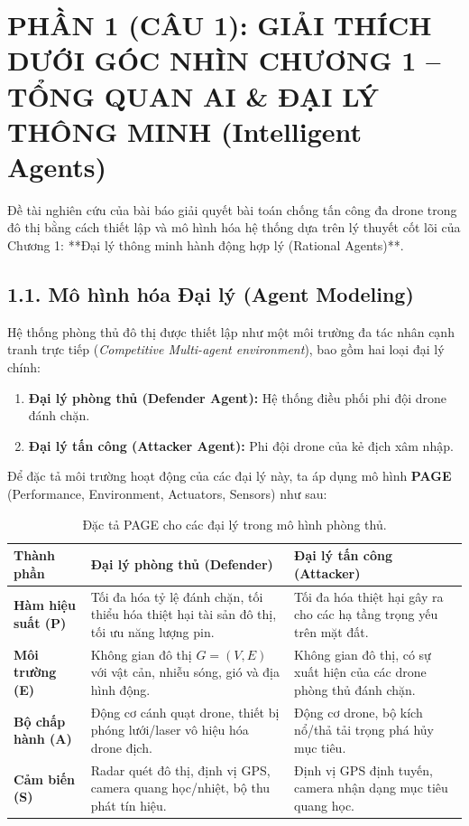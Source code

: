 \documentclass[../main.tex]{subfiles}
\begin{document}

\section{PHẦN 1 (CÂU 1): GIẢI THÍCH DƯỚI GÓC NHÌN CHƯƠNG 1 -- TỔNG QUAN AI \& ĐẠI LÝ THÔNG MINH (Intelligent Agents)}

Đề tài nghiên cứu của bài báo \cite{mutzari2025defending} giải quyết bài toán chống tấn công đa drone trong đô thị bằng cách thiết lập và mô hình hóa hệ thống dựa trên lý thuyết cốt lõi của Chương 1: **Đại lý thông minh hành động hợp lý (Rational Agents)**. 

\subsection{1.1. Mô hình hóa Đại lý (Agent Modeling)}
Hệ thống phòng thủ đô thị được thiết lập như một môi trường đa tác nhân cạnh tranh trực tiếp (\textit{Competitive Multi-agent environment}), bao gồm hai loại đại lý chính:
\begin{enumerate}
    \item \textbf{Đại lý phòng thủ (Defender Agent):} Hệ thống điều phối phi đội drone đánh chặn.
    \item \textbf{Đại lý tấn công (Attacker Agent):} Phi đội drone của kẻ địch xâm nhập.
\end{enumerate}

Để đặc tả môi trường hoạt động của các đại lý này, ta áp dụng mô hình \textbf{PAGE} (Performance, Environment, Actuators, Sensors) như sau:

\begin{table}[h!]
\centering
\small
\begin{tabular}{|p{2.5cm}|p{4.5cm}|p{4.5cm}|}
\hline
\textbf{Thành phần} & \textbf{Đại lý phòng thủ (Defender)} & \textbf{Đại lý tấn công (Attacker)} \\ \hline
\textbf{Hàm hiệu suất (P)} & Tối đa hóa tỷ lệ đánh chặn, tối thiểu hóa thiệt hại tài sản đô thị, tối ưu năng lượng pin. & Tối đa hóa thiệt hại gây ra cho các hạ tầng trọng yếu trên mặt đất. \\ \hline
\textbf{Môi trường (E)} & Không gian đô thị $G=(V,E)$ với vật cản, nhiễu sóng, gió và địa hình động. & Không gian đô thị, có sự xuất hiện của các drone phòng thủ đánh chặn. \\ \hline
\textbf{Bộ chấp hành (A)} & Động cơ cánh quạt drone, thiết bị phóng lưới/laser vô hiệu hóa drone địch. & Động cơ drone, bộ kích nổ/thả tải trọng phá hủy mục tiêu. \\ \hline
\textbf{Cảm biến (S)} & Radar quét đô thị, định vị GPS, camera quang học/nhiệt, bộ thu phát tín hiệu. & Định vị GPS định tuyến, camera nhận dạng mục tiêu quang học. \\ \hline
\end{tabular}
\caption{Đặc tả PAGE cho các đại lý trong mô hình phòng thủ.}
\end{table}
\end{document}
